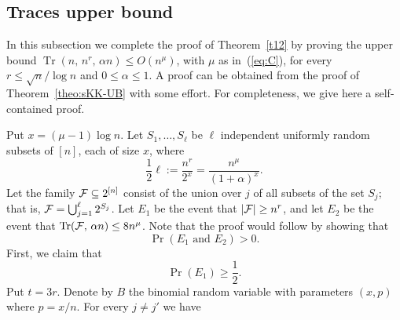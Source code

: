 \documentclass[11pt]{article}
\newcommand{\FF}{{\cal F}}
\renewcommand{\a}{\alpha}
\newcommand{\sub}{\subseteq}
\newcommand{\C}{\mu}
\DeclareMathOperator{\trace}{Tr}
\begin{document}
\subsection{Traces upper bound}\label{subsec:UB-traces}

In this subsection we complete the proof of Theorem~\ref{t12} by proving the upper bound
$\trace(n,\,n^r,\,\a n) \le O(n^{\C})$, with $\C$ as in~(\ref{eq:C}), for every $r \le \sqrt{n}/\log n$ and $0 \le \a \le 1$.
A proof can be obtained from the proof of Theorem~\ref{theo:sKK-UB} with some effort. For completeness, we give here a self-contained proof.

Put $x=(\C-1)\log n$.
Let $S_1,\ldots,S_\ell$ be $\ell$ independent uniformly random subsets of $[n]$, each of size $x$,
where
\begin{equation}\label{eq:UB-identity}
\frac12\ell := \frac{n^r}{2^x} = \frac{n^{\C}}{(1+\a)^x}.
\end{equation}
%
Let the family $\FF \sub 2^{[n]}$ consist of the union over $j$ of 
all subsets of the set $S_j$; that is, $\FF = \bigcup_{j=1}^\ell 2^{S_j}$.
Let $E_1$ be the event that $|\FF| \ge n^r$, and let $E_2$ be the event that  $\trace(\FF,\,\a n) \le 8n^\C$.
Note that the proof would follow by showing that %
\begin{equation}\label{eq:traces-goal}
\Pr(E_1 \text{ and } E_2) > 0.
\end{equation}
First, we claim that
\begin{equation}\label{eq:F-size}
\Pr(E_1) \ge \frac12 .
\end{equation}
Put $t=3r$.
Denote by $B$ the binomial random variable with parameters $(x,p)$ where $p=x/n$. For every $j \neq j'$ we have
\end{document}
